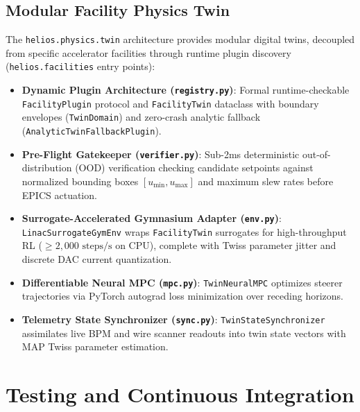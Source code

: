 \documentclass[11pt,a4paper]{report}
\begin{document}
\section{Modular Facility Physics Twin}
The \texttt{helios.physics.twin} architecture provides modular digital twins, decoupled from specific accelerator facilities through runtime plugin discovery (\texttt{helios.facilities} entry points):
\begin{itemize}
    \item \textbf{Dynamic Plugin Architecture (\texttt{registry.py})}: Formal runtime-checkable \texttt{FacilityPlugin} protocol and \texttt{FacilityTwin} dataclass with boundary envelopes (\texttt{TwinDomain}) and zero-crash analytic fallback (\texttt{AnalyticTwinFallbackPlugin}).
    \item \textbf{Pre-Flight Gatekeeper (\texttt{verifier.py})}: Sub-2ms deterministic out-of-distribution (OOD) verification checking candidate setpoints against normalized bounding boxes $[u_{\min}, u_{\max}]$ and maximum slew rates before EPICS actuation.
    \item \textbf{Surrogate-Accelerated Gymnasium Adapter (\texttt{env.py})}: \texttt{LinacSurrogateGymEnv} wraps \texttt{FacilityTwin} surrogates for high-throughput RL ($\ge 2{,}000\text{ steps/s}$ on CPU), complete with Twiss parameter jitter and discrete DAC current quantization.
    \item \textbf{Differentiable Neural MPC (\texttt{mpc.py})}: \texttt{TwinNeuralMPC} optimizes steerer trajectories via PyTorch autograd loss minimization over receding horizons.
    \item \textbf{Telemetry State Synchronizer (\texttt{sync.py})}: \texttt{TwinStateSynchronizer} assimilates live BPM and wire scanner readouts into twin state vectors with MAP Twiss parameter estimation.
\end{itemize}

\chapter{Testing and Continuous Integration}
\end{document}
